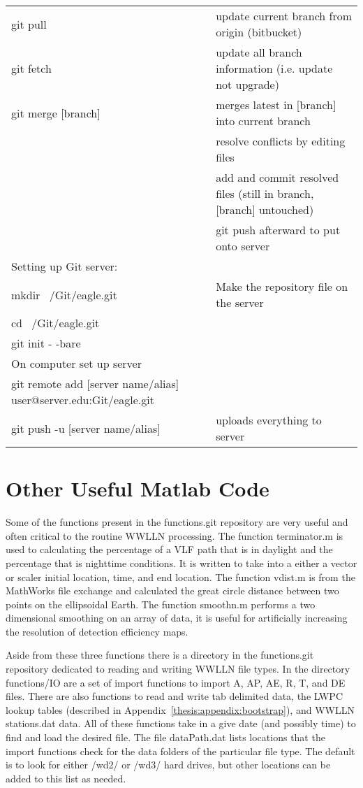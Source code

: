 \begin{landscape}
\begin{center}
\begin{longtable}{|p{4in}|p{4in}|}
git pull & update current branch from origin (bitbucket) \\
git fetch & update all branch information (i.e. update not upgrade) \\
git merge [branch] & merges latest in [branch] into current branch \\
& resolve conflicts by editing files \\
& add and commit resolved files (still in branch, [branch] untouched) \\
& git push afterward to put onto server \\
Setting up Git server: & \\
mkdir ~/Git/eagle.git & Make the repository file on the server \\
cd ~/Git/eagle.git & \\
git init - -bare & \\
On computer set up server & \\
git remote add [server name/alias] user@server.edu:Git/eagle.git & \\
git push -u [server name/alias] & uploads everything to server 
\label{label}
\end{longtable}
\end{center}
\end{landscape}

\section{Other Useful Matlab Code}

Some of the functions present in the functions.git repository are very useful and often critical to the routine WWLLN processing.
The function terminator.m is used to calculating the percentage of a VLF path that is in daylight and the percentage that is nighttime conditions.
It is written to take into a either a vector or scaler initial location, time, and end location.
The function vdist.m is from the MathWorks file exchange and calculated the great circle distance between two points on the ellipsoidal Earth.
The function smoothn.m performs a two dimensional smoothing on an array of data, it is useful for artificially increasing the resolution of detection efficiency maps.

Aside from these three functions there is a directory in the functions.git repository dedicated to reading and writing WWLLN file types.
In the directory functions/IO are a set of import functions to import A, AP, AE, R, T, and DE files.
There are also functions to read and write tab delimited data, the LWPC lookup tables (described in Appendix~\ref{thesis:appendix:bootstrap}), and WWLLN stations.dat data.
All of these functions take in a give date (and possibly time) to find and load the desired file.
The file dataPath.dat lists locations that the import functions check for the data folders of the particular file type.
The default is to look for either /wd2/ or /wd3/ hard drives, but other locations can be added to this list as needed.
